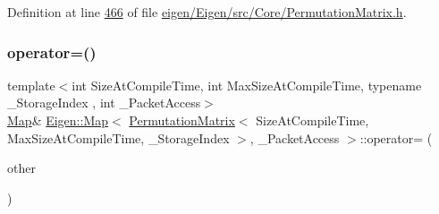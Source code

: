 Definition at line \hyperlink{eigen_2_eigen_2src_2_core_2_permutation_matrix_8h_source_l00466}{466} of file \hyperlink{eigen_2_eigen_2src_2_core_2_permutation_matrix_8h_source}{eigen/\+Eigen/src/\+Core/\+Permutation\+Matrix.\+h}.

\mbox{\label{class_eigen_1_1_map_3_01_permutation_matrix_3_01_size_at_compile_time_00_01_max_size_at_compile_2f9d18bf0084dbfb13fbbfe14adaf22d_a209e4e7eee11a5ca52dbb5c3ec1ffa44}} 
\subsubsection{\texorpdfstring{operator=()}{operator=()}\hspace{0.1cm}{\footnotesize\ttfamily [6/6]}}
{\footnotesize\ttfamily template$<$int Size\+At\+Compile\+Time, int Max\+Size\+At\+Compile\+Time, typename \+\_\+\+Storage\+Index , int \+\_\+\+Packet\+Access$>$ \\
\hyperlink{group___core___module_class_eigen_1_1_map}{Map}\& \hyperlink{group___core___module_class_eigen_1_1_map}{Eigen\+::\+Map}$<$ \hyperlink{group___core___module_class_eigen_1_1_permutation_matrix}{Permutation\+Matrix}$<$ Size\+At\+Compile\+Time, Max\+Size\+At\+Compile\+Time, \+\_\+\+Storage\+Index $>$, \+\_\+\+Packet\+Access $>$\+::operator= (\begin{DoxyParamCaption}\item[{const \hyperlink{group___core___module_class_eigen_1_1_map}{Map}$<$ \hyperlink{group___core___module_class_eigen_1_1_permutation_matrix}{Permutation\+Matrix}$<$ Size\+At\+Compile\+Time, Max\+Size\+At\+Compile\+Time, \+\_\+\+Storage\+Index $>$, \+\_\+\+Packet\+Access $>$ \&}]{other }\end{DoxyParamCaption})\hspace{0.3cm}{\ttfamily [inline]}}

